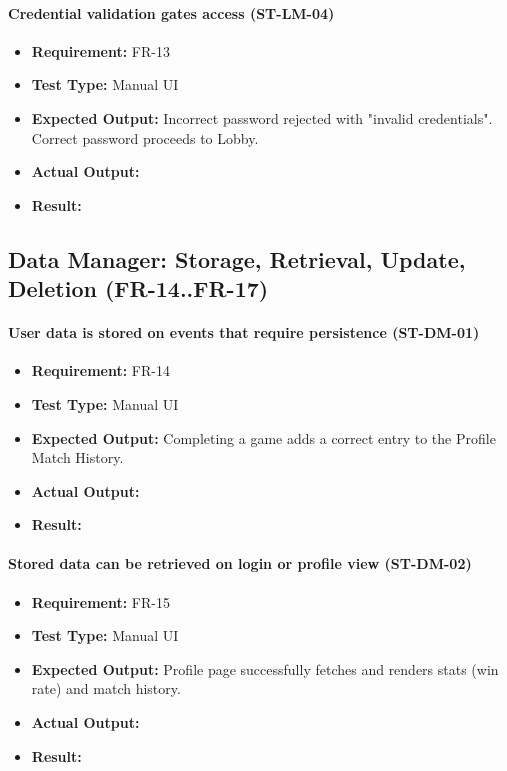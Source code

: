 \documentclass[12pt, titlepage]{article}
\begin{document}
\paragraph{Credential validation gates access (ST-LM-04)}
\begin{itemize}
  \item \textbf{Requirement:} FR-13
  \item \textbf{Test Type:} Manual UI
  \item \textbf{Expected Output:} Incorrect password rejected with "invalid credentials". Correct password proceeds to Lobby.
  \item \textbf{Actual Output:} 
  \item \textbf{Result:} 
\end{itemize}


\subsection{Data Manager: Storage, Retrieval, Update, Deletion (FR-14..FR-17)}

\paragraph{User data is stored on events that require persistence (ST-DM-01)}
\begin{itemize}
  \item \textbf{Requirement:} FR-14
  \item \textbf{Test Type:} Manual UI
  \item \textbf{Expected Output:} Completing a game adds a correct entry to the Profile Match History.
  \item \textbf{Actual Output:} 
  \item \textbf{Result:} 
\end{itemize}

\paragraph{Stored data can be retrieved on login or profile view (ST-DM-02)}
\begin{itemize}
  \item \textbf{Requirement:} FR-15
  \item \textbf{Test Type:} Manual UI
  \item \textbf{Expected Output:} Profile page successfully fetches and renders stats (win rate) and match history.
  \item \textbf{Actual Output:} 
  \item \textbf{Result:} 
\end{itemize}
\end{document}
